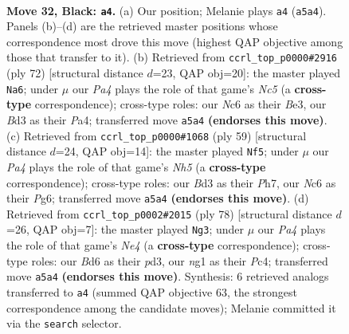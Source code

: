 \documentclass[11pt]{article}
\begin{document}
\clearpage

\begin{figure}[p]\centering
\begin{subfigure}{0.46\textwidth}\centering
\resizebox{\linewidth}{!}{%
\newchessgame
\chessboard[
  setfen={2k5/8/1Bnb2p1/p5P1/8/3b4/8/4K1N1 b - - 1 32},
  showmover=false,
  pgfstyle=straightmove, color=movearrow, markmove={a5-a4}
]}
\caption{}
\end{subfigure}\hfill
\begin{subfigure}{0.46\textwidth}\centering
\resizebox{\linewidth}{!}{%
\newchessgame
\chessboard[
  setfen={4bb2/p7/8/2N2k2/P7/1P2B3/4K3/8 w - - 4 37},
  showmover=false,
  pgfstyle=straightmove, color=movearrow, markmove={c5-a6}
]}
\caption{}
\end{subfigure}
\\[4pt]
\begin{subfigure}{0.46\textwidth}\centering
\resizebox{\linewidth}{!}{%
\newchessgame
\chessboard[
  setfen={3B3k/7p/6p1/1p6/7n/1B5P/Pb3K2/8 b - - 0 30},
  showmover=false,
  pgfstyle=straightmove, color=movearrow, markmove={h4-f5}
]}
\caption{}
\end{subfigure}\hfill
\begin{subfigure}{0.46\textwidth}\centering
\resizebox{\linewidth}{!}{%
\newchessgame
\chessboard[
  setfen={5k2/8/8/4pp2/2P1N3/b2p4/P4P2/5K2 w - - 0 40},
  showmover=false,
  pgfstyle=straightmove, color=movearrow, markmove={e4-g3}
]}
\caption{}
\end{subfigure}
\caption{\textbf{Move 32, Black: \texttt{a4}.} (a) Our position; Melanie plays \texttt{a4} (\texttt{a5a4}). Panels (b)--(d) are the retrieved master positions whose correspondence most drove this move (highest QAP objective among those that transfer to it). (b) Retrieved from \texttt{ccrl\_top\_p0000\#2916} (ply 72) [structural distance $d$=23, QAP obj=20]: the master played \texttt{Na6}; under $\mu$ our \emph{Pa4} plays the role of that game's \emph{Nc5} (a \textbf{cross-type} correspondence); cross-type roles: our \emph{N}c6 as their \emph{B}e3, our \emph{B}d3 as their \emph{P}a4; transferred move \texttt{a5a4} \textbf{(endorses this move)}. (c) Retrieved from \texttt{ccrl\_top\_p0000\#1068} (ply 59) [structural distance $d$=24, QAP obj=14]: the master played \texttt{Nf5}; under $\mu$ our \emph{Pa4} plays the role of that game's \emph{Nh5} (a \textbf{cross-type} correspondence); cross-type roles: our \emph{B}d3 as their \emph{P}h7, our \emph{N}c6 as their \emph{P}g6; transferred move \texttt{a5a4} \textbf{(endorses this move)}. (d) Retrieved from \texttt{ccrl\_top\_p0002\#2015} (ply 78) [structural distance $d$=26, QAP obj=7]: the master played \texttt{Ng3}; under $\mu$ our \emph{Pa4} plays the role of that game's \emph{Ne4} (a \textbf{cross-type} correspondence); cross-type roles: our \emph{B}d6 as their \emph{p}d3, our \emph{n}g1 as their \emph{P}c4; transferred move \texttt{a5a4} \textbf{(endorses this move)}. Synthesis: 6 retrieved analogs transferred to \texttt{a4} (summed QAP objective 63, the strongest correspondence among the candidate moves); Melanie committed it via the \texttt{search} selector.}
\label{fig:thought-m63}
\end{figure}
\end{document}
